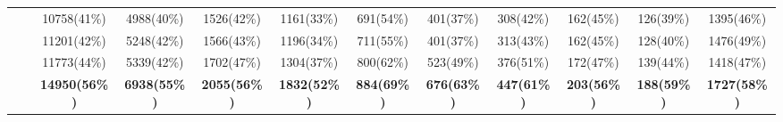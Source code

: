 \begin{table*}[htbp]
{\begin{tabular}{c|c|c|ccccccccc}
          & \rann{} & 10758(41\%) & 4988(40\%) & 1526(42\%) & 1161(33\%) & 691(54\%) & 401(37\%) & 308(42\%) & 162(45\%) & 126(39\%) & 1395(46\%) \\
          & \inte{} & 11201(42\%) & 5248(42\%) & 1566(43\%) & 1196(34\%) & 711(55\%) & 401(37\%) & 313(43\%) & 162(45\%) & 128(40\%) & 1476(49\%) \\
          & \edit{} & 11773(44\%) & 5339(42\%) & 1702(47\%) & 1304(37\%) & 800(62\%) & 523(49\%) & 376(51\%) & 172(47\%) & 139(44\%) & 1418(47\%) \\
          & \toolname{} & \textbf{14950(56\%)} & \textbf{6938(55\%)} & \textbf{2055(56\%)} & \textbf{1832(52\%)} & \textbf{884(69\%)} & \textbf{676(63\%)} & \textbf{447(61\%)} & \textbf{203(56\%)} & \textbf{188(59\%)} & \textbf{1727(58\%)} \\
    \bottomrule
    \end{tabular}%
    }
  \label{tab:type}%
\end{table*}%
